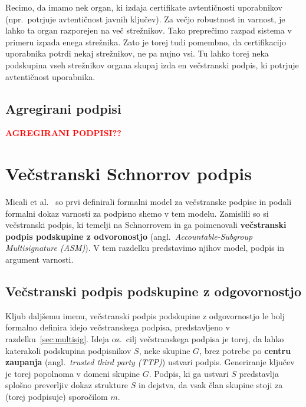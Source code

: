 \documentclass[isrm2, tisk]{fmfdelo}
\newcommand{\todo}[1]{\textcolor{red}{\textbf{\uppercase{#1}??}}}
\begin{document}
\begin{primer}
    Recimo, da imamo nek organ, ki izdaja certifikate avtentičnosti uporabnikov (npr.\ potrjuje 
    avtentičnost javnih ključev). Za večjo robustnost in varnost, je lahko ta organ razporejen 
    na več strežnikov. Tako preprečimo razpad sistema v primeru izpada enega strežnika. Zato je 
    torej tudi pomembno, da certifikacijo uporabnika potrdi nekaj strežnikov, ne pa nujno vsi. 
    Tu lahko torej neka podskupina vseh strežnikov organa skupaj izda en večstranski podpis, ki 
    potrjuje avtentičnost uporabnika.
\end{primer}

\subsection{Agregirani podpisi}
\todo{agregirani podpisi}

\section{Večstranski Schnorrov podpis}
\label{sec:multischnorr}
Micali et al.~\cite{micali2001asm} so prvi definirali formalni model za večstranske podpise in podali 
formalni dokaz varnosti za podpisno shemo v tem modelu. Zamislili so si večstranski podpis, ki temelji 
na Schnorrovem in ga poimenovali \textbf{večstranski podpis podskupine z odvoronostjo} (angl.\ 
\textit{Accountable-Subgroup Multisignature (ASM)}). V tem razdelku predstavimo njihov model, podpis 
in argument varnosti.

\subsection{Večstranski podpis podskupine z odgovornostjo}
Kljub daljšemu imenu, večstranski podpis podskupine z odgovornostjo le bolj formalno definira idejo 
večstranskega podpisa, predstavljeno v razdelku~\ref{sec:multisig}. Ideja oz.\ cilj večstranskega 
podpisa je torej, da lahko katerakoli podskupina podpisnikov $S$, neke skupine $G$, brez potrebe po 
\textbf{centru zaupanja} (angl.\ \textit{trusted third party (TTP)}) ustvari podpis. 
Generiranje ključev je torej popolnoma v domeni skupine $G$. Podpis, ki ga ustvari $S$ predstavlja 
splošno preverljiv dokaz strukture $S$ in dejstva, da vsak član skupine stoji za (torej podpisuje) 
sporočilom $m$.
\end{document}
